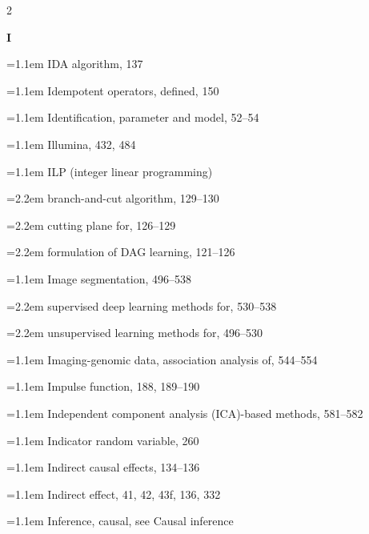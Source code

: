 \begin{multicols}{2}
\par{}\medskip\noindent\textbf{I}\par\nobreak\smallskip\nobreak
\noindent\hangindent=1.1em IDA algorithm, 137\par
\noindent\hangindent=1.1em Idempotent operators, defined, 150\par
\noindent\hangindent=1.1em Identification, parameter and model, 52--54\par
\noindent\hangindent=1.1em Illumina, 432, 484\par
\noindent\hangindent=1.1em ILP (integer linear programming)\par
\noindent\hangindent=2.2em \hspace*{1.1em}branch-and-cut algorithm, 129--130\par
\noindent\hangindent=2.2em \hspace*{1.1em}cutting plane for, 126--129\par
\noindent\hangindent=2.2em \hspace*{1.1em}formulation of DAG learning, 121--126\par
\noindent\hangindent=1.1em Image segmentation, 496--538\par
\noindent\hangindent=2.2em \hspace*{1.1em}supervised deep learning methods for, 530--538\par
\noindent\hangindent=2.2em \hspace*{1.1em}unsupervised learning methods for, 496--530\par
\noindent\hangindent=1.1em Imaging-genomic data, association analysis of, 544--554\par
\noindent\hangindent=1.1em Impulse function, 188, 189--190\par
\noindent\hangindent=1.1em Independent component analysis (ICA)-based methods, 581--582\par
\noindent\hangindent=1.1em Indicator random variable, 260\par
\noindent\hangindent=1.1em Indirect causal effects, 134--136\par
\noindent\hangindent=1.1em Indirect effect, 41, 42, 43f, 136, 332\par
\noindent\hangindent=1.1em Inference, causal, see Causal inference\par

\end{multicols}
